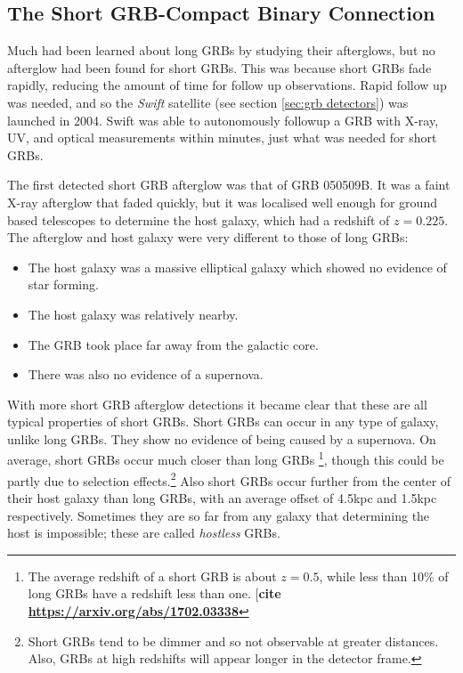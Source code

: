 \documentclass[11pt]{cuthesis}
\begin{document}
\subsection{The Short GRB-Compact Binary Connection} \label{sec: short grbs}
Much had been learned about long GRBs by studying their afterglows, but no afterglow had been found for short GRBs. This was because short GRBs fade rapidly, reducing the amount of time for follow up observations. Rapid follow up was needed, and so the \textit{Swift} satellite (see section \ref{sec:grb detectors}) was launched in 2004. Swift was able to autonomously followup a GRB with X-ray, UV, and optical measurements within minutes, just what was needed for short GRBs. 

The first detected short GRB afterglow was that of GRB 050509B. It was a faint X-ray afterglow that faded quickly, but it was localised well enough for ground based telescopes to determine the host galaxy, which had a redshift of $z=0.225$. The afterglow and host galaxy were very different to those of long GRBs:
\begin{itemize}
\item The host galaxy was a massive elliptical galaxy which showed no evidence of star forming.
\item The host galaxy was relatively nearby.
\item The GRB took place far away from the galactic core.
\item There was also no evidence of a supernova.
\end{itemize} 
With more short GRB afterglow detections it became clear that these are all typical properties of short GRBs. Short GRBs can occur in any type of galaxy, unlike long GRBs. They show no evidence of being caused by a supernova. On average, short GRBs occur much closer than long GRBs \footnote{The average redshift of a short GRB is about $z=0.5$, while less than 10\% of long GRBs have a redshift less than one. [\textbf{cite \url{https://arxiv.org/abs/1702.03338}}}, though this could be partly due to selection effects.\footnote{Short GRBs tend to be dimmer and so not observable at greater distances. Also, GRBs at  high redshifts will appear longer in the detector frame.}  Also short GRBs occur further from the center of their host galaxy than long GRBs, with an average offset of 4.5kpc and 1.5kpc respectively. Sometimes they are so far from any galaxy that determining the host is impossible; these are called \textit{hostless} GRBs.
\end{document}
